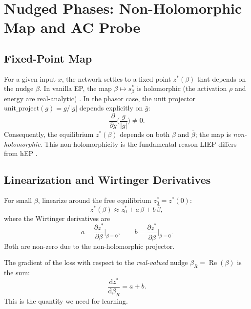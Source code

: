 \documentclass[11pt]{article}
\newcommand{\dd}{\mathrm{d}}
\newcommand{\unitproject}{\mathrm{unit\_project}}
\DeclareMathOperator{\Real}{Re}
\begin{document}
\section{Nudged Phases: Non-Holomorphic Map and AC Probe}\label{sec:nudged}

\subsection{Fixed-Point Map}

For a given input $x$, the network settles to a fixed point $z^*(\beta)$ that depends on the nudge $\beta$. In vanilla EP, the map $\beta \mapsto s_\beta^*$ is holomorphic (the activation $\rho$ and energy are real-analytic) \citep{scellier2017equilibrium}. In the phasor case, the unit projector $\unitproject(g) = g/|g|$ depends explicitly on $\bar{g}$:
\begin{equation}
\frac{\partial}{\partial \bar{g}} \Big( \frac{g}{|g|} \Big) \neq 0.
\end{equation}
Consequently, the equilibrium $z^*(\beta)$ depends on both $\beta$ and $\bar{\beta}$; the map is \emph{non-holomorphic}. This non-holomorphicity is the fundamental reason LIEP differs from hEP \citep{laborieux2022holomorphic}.

\subsection{Linearization and Wirtinger Derivatives}

For small $\beta$, linearize around the free equilibrium $z_0^* = z^*(0)$:
\begin{equation}\label{eq:linearized-map}
z^*(\beta) \approx z_0^* + a\,\beta + b\,\bar{\beta},
\end{equation}
where the Wirtinger derivatives are
\begin{equation}\label{eq:wirtinger-a-b}
a = \frac{\partial z^*}{\partial \beta}\Big|_{\beta=0},
\qquad
b = \frac{\partial z^*}{\partial \bar{\beta}}\Big|_{\beta=0}.
\end{equation}
Both are non-zero due to the non-holomorphic projector.

The gradient of the loss with respect to the \emph{real-valued} nudge $\beta_R = \Real(\beta)$ is the sum:
\begin{equation}\label{eq:real-gradient}
\frac{\dd z^*}{\dd \beta_R} = a + b.
\end{equation}
This is the quantity we need for learning.
\end{document}
